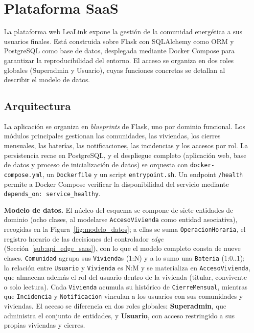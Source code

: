 \documentclass[12pt, a4paper, twoside]{report}
\begin{document}
\section{Plataforma SaaS}
\label{sec:saas}

La plataforma web LeaLink expone la gestión de la comunidad energética a sus
usuarios finales. Está construida sobre Flask con SQLAlchemy como ORM y
PostgreSQL como base de datos, desplegada mediante Docker Compose para
garantizar la reproducibilidad del entorno. El acceso se organiza en dos roles
globales (Superadmin y Usuario), cuyas funciones concretas se detallan al
describir el modelo de datos.

\subsection{Arquitectura}

La aplicación se organiza en \textit{blueprints} de Flask, uno por dominio
funcional. Los módulos principales gestionan las comunidades, las viviendas, los
cierres mensuales, las baterías, las notificaciones, las incidencias y los
accesos por rol. La persistencia recae en PostgreSQL, y el despliegue completo
(aplicación web, base de datos y proceso de inicialización de datos) se orquesta
con \texttt{docker-compose.yml}, un \texttt{Dockerfile} y un script
\texttt{entrypoint.sh}. Un endpoint \texttt{/health} permite a Docker Compose
verificar la disponibilidad del servicio mediante
\texttt{depends\_on: service\_healthy}.

\textbf{Modelo de datos.} El núcleo del esquema se compone de siete entidades
de dominio (ocho clases, al modelarse \texttt{AccesoVivienda} como entidad
asociativa), recogidas en la Figura~\ref{fig:modelo_datos}; a ellas se suma
\texttt{OperacionHoraria}, el registro horario de las decisiones del
controlador \textit{edge} (Sección~\ref{sub:api_edge_saas}), con lo que el
modelo completo consta de nueve clases. \texttt{Comunidad} agrupa sus \texttt{Vivienda}s
(1:N) y a lo sumo una \texttt{Bateria} (1:0..1); la relación entre
\texttt{Usuario} y \texttt{Vivienda} es N:M y se materializa en
\texttt{AccesoVivienda}, que almacena además el rol del usuario dentro de la
vivienda (titular, convivente o solo lectura). Cada \texttt{Vivienda} acumula su
histórico de \texttt{CierreMensual}, mientras que \texttt{Incidencia} y
\texttt{Notificacion} vinculan a los usuarios con sus comunidades y viviendas. El
acceso se diferencia en dos roles globales: \textbf{Superadmin}, que administra
el conjunto de entidades, y \textbf{Usuario}, con acceso restringido a sus
propias viviendas y cierres.
\end{document}
